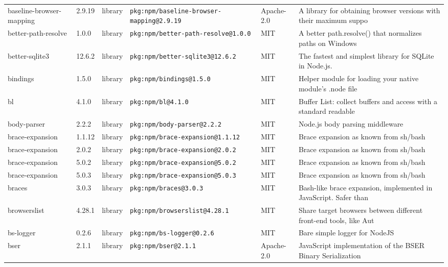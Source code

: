 \documentclass[11pt,a4paper]{article}
\begin{document}
\begin{longtable}{|p{4cm}|p{2cm}|p{1.6cm}|p{5cm}|p{1.5cm}|p{3.5cm}|}
\raggedright baseline-browser-mapping & 2.9.19 & library & \small\texttt{pkg:npm/baseline-browser-mapping@2.9.19} & Apache-2.0 & \small A library for obtaining browser versions with their maximum suppo \\
\raggedright better-path-resolve & 1.0.0 & library & \small\texttt{pkg:npm/better-path-resolve@1.0.0} & MIT & \small A better path.resolve() that normalizes paths on Windows \\
\raggedright better-sqlite3 & 12.6.2 & library & \small\texttt{pkg:npm/better-sqlite3@12.6.2} & MIT & \small The fastest and simplest library for SQLite in Node.js. \\
\raggedright bindings & 1.5.0 & library & \small\texttt{pkg:npm/bindings@1.5.0} & MIT & \small Helper module for loading your native module's .node file \\
\raggedright bl & 4.1.0 & library & \small\texttt{pkg:npm/bl@4.1.0} & MIT & \small Buffer List: collect buffers and access with a standard readable  \\
\raggedright body-parser & 2.2.2 & library & \small\texttt{pkg:npm/body-parser@2.2.2} & MIT & \small Node.js body parsing middleware \\
\raggedright brace-expansion & 1.1.12 & library & \small\texttt{pkg:npm/brace-expansion@1.1.12} & MIT & \small Brace expansion as known from sh/bash \\
\raggedright brace-expansion & 2.0.2 & library & \small\texttt{pkg:npm/brace-expansion@2.0.2} & MIT & \small Brace expansion as known from sh/bash \\
\raggedright brace-expansion & 5.0.2 & library & \small\texttt{pkg:npm/brace-expansion@5.0.2} & MIT & \small Brace expansion as known from sh/bash \\
\raggedright brace-expansion & 5.0.3 & library & \small\texttt{pkg:npm/brace-expansion@5.0.3} & MIT & \small Brace expansion as known from sh/bash \\
\raggedright braces & 3.0.3 & library & \small\texttt{pkg:npm/braces@3.0.3} & MIT & \small Bash-like brace expansion, implemented in JavaScript. Safer than  \\
\raggedright browserslist & 4.28.1 & library & \small\texttt{pkg:npm/browserslist@4.28.1} & MIT & \small Share target browsers between different front-end tools, like Aut \\
\raggedright bs-logger & 0.2.6 & library & \small\texttt{pkg:npm/bs-logger@0.2.6} & MIT & \small Bare simple logger for NodeJS \\
\raggedright bser & 2.1.1 & library & \small\texttt{pkg:npm/bser@2.1.1} & Apache-2.0 & \small JavaScript implementation of the BSER Binary Serialization \\

\end{longtable}
\end{document}
